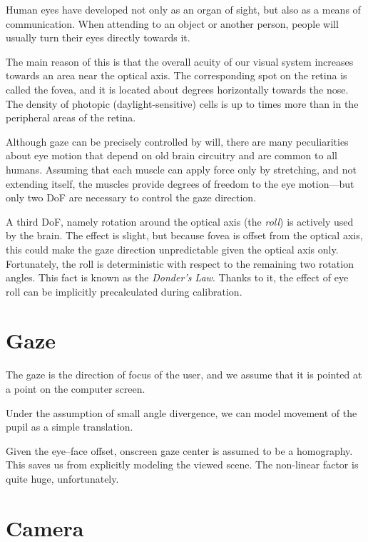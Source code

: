 Human eyes have developed not only as an organ of sight, but also as a means of communication.
When attending to an object or another person, people will usually turn their eyes directly towards it.

The main reason of this is that the overall acuity of our visual system increases towards an area near the optical axis.
The corresponding spot on the retina is called the fovea, and it is located about  degrees horizontally towards the nose.
The density of photopic (daylight-sensitive) cells is up to  times more than in the peripheral areas of the retina.

Although gaze can be precisely controlled by will, there are many peculiarities about eye motion that depend on old brain circuitry and are common to all humans.
Assuming that each muscle can apply force only by stretching, and not extending itself, the  muscles provide  degrees of freedom to the eye motion---but only two DoF are necessary to control the gaze direction.

A third DoF, namely rotation around the optical axis (the \textit{roll}) is actively used by the brain.
The effect is slight, but because fovea is offset from the optical axis, this could make the gaze direction unpredictable given the optical axis only.
Fortunately, the roll is deterministic with respect to the remaining two rotation angles.
This fact is known as the \textit{Donder's Law}.
Thanks to it, the effect of eye roll can be implicitly precalculated during calibration.


\section{Gaze}

The gaze is the direction of focus of the user, and we assume that it is pointed at a point on the computer screen.

Under the assumption of small angle divergence, we can model movement of the pupil as a simple translation.

Given the eye--face offset, onscreen gaze center is assumed to be a homography.
This saves us from explicitly modeling the viewed scene.
The non-linear factor is quite huge, unfortunately.

\section{Camera}


